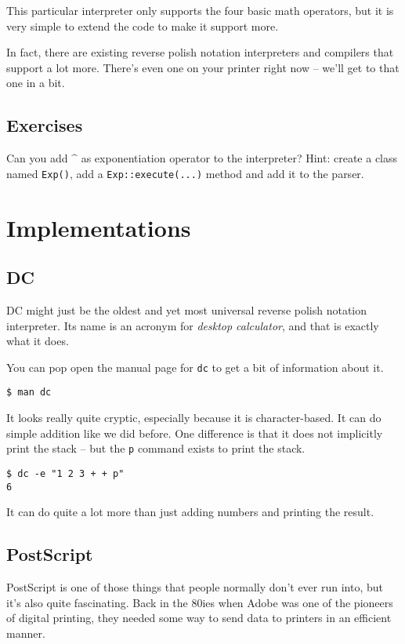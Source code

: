 \documentclass[a4paper,twocolumn]{article}
\begin{document}
This particular interpreter only supports the four basic math operators, but it is very simple to extend the code to make it support more.

In fact, there are existing reverse polish notation interpreters and compilers that support a lot more. There's even one on your printer right now -- we'll get to that one in a bit.

\subsection*{Exercises}

Can you add $\^$ as exponentiation operator to the interpreter? Hint: create a class named \verb|Exp()|, add a \verb|Exp::execute(...)| method and add it to the parser.

\section{Implementations}

\subsection{DC}

DC might just be the oldest and yet most universal reverse polish notation interpreter. Its name is an acronym for \emph{desktop calculator}, and that is exactly what it does.

You can pop open the manual page for \verb|dc| to get a bit of information about it.

\begin{verbatim}
$ man dc
\end{verbatim}

It looks really quite cryptic, especially because it is character-based. It can do simple addition like we did before. One difference is that it does not implicitly print the stack -- but the \verb|p| command exists to print the stack.

\begin{verbatim}
$ dc -e "1 2 3 + + p"
6
\end{verbatim}

It can do quite a lot more than just adding numbers and printing the result. 


\subsection{PostScript}

PostScript is one of those things that people normally don't ever run into, but it's also quite fascinating. Back in the 80ies when Adobe was one of the pioneers of digital printing, they needed some way to send data to printers in an efficient manner.
\end{document}
